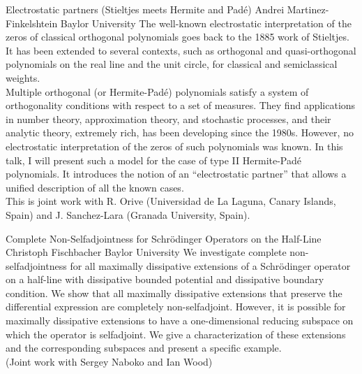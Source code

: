 \begin{addmargin}[2em]{0em}
\vspace{1.5ex}
\abs
{Electrostatic partners (Stieltjes meets Hermite and Padé)}
{Andrei Martinez-Finkelshtein}
{Baylor University}
{The well-known electrostatic interpretation of the zeros of classical orthogonal polynomials goes back to the 1885 work of Stieltjes. It has been extended to several contexts, such as orthogonal and quasi-orthogonal polynomials on the real line and the unit circle, for classical and semiclassical weights.\\
Multiple orthogonal (or Hermite-Padé) polynomials satisfy a system of orthogonality conditions with respect to a set of measures. They find applications in number theory, approximation theory, and stochastic processes, and their analytic theory, extremely rich, has been developing since the 1980s. However, no electrostatic interpretation of the zeros of such polynomials was known. In this talk, I will present such a model for the case of type II Hermite-Padé polynomials. It introduces the notion of an “electrostatic partner” that allows a unified description of all the known cases.\\
This is joint work with R. Orive (Universidad de La Laguna, Canary Islands, Spain) and J. Sanchez-Lara (Granada University, Spain).}


\vspace{1.5ex}
\abs
{Complete Non-Selfadjointness for Schr\"odinger Operators on the Half-Line}
{Christoph Fischbacher}
{Baylor University}
{We investigate complete non-selfadjointness for all maximally dissipative extensions of a Schr\"odinger operator on a half-line with dissipative bounded potential and dissipative boundary condition. We show that all maximally dissipative extensions that preserve the differential expression are completely non-selfadjoint. However, it is possible for maximally dissipative extensions to have a one-dimensional reducing subspace on which the operator is selfadjoint. We give a characterization of these extensions and the corresponding subspaces and present a specific example.\\
(Joint work with Sergey Naboko and Ian Wood)}
\end{addmargin}
